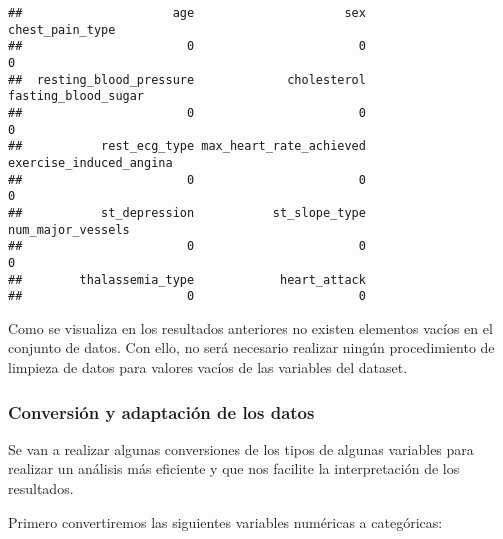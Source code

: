 \documentclass[
]{article}
\begin{document}
\begin{verbatim}
##                     age                     sex         chest_pain_type 
##                       0                       0                       0 
##  resting_blood_pressure             cholesterol     fasting_blood_sugar 
##                       0                       0                       0 
##           rest_ecg_type max_heart_rate_achieved exercise_induced_angina 
##                       0                       0                       0 
##           st_depression           st_slope_type       num_major_vessels 
##                       0                       0                       0 
##        thalassemia_type            heart_attack 
##                       0                       0
\end{verbatim}

Como se visualiza en los resultados anteriores no existen elementos
vacíos en el conjunto de datos. Con ello, no será necesario realizar
ningún procedimiento de limpieza de datos para valores vacíos de las
variables del dataset.

\hypertarget{conversiuxf3n-y-adaptaciuxf3n-de-los-datos}{%
\subsubsection{Conversión y adaptación de los
datos}\label{conversiuxf3n-y-adaptaciuxf3n-de-los-datos}}

Se van a realizar algunas conversiones de los tipos de algunas variables
para realizar un análisis más eficiente y que nos facilite la
interpretación de los resultados.

Primero convertiremos las siguientes variables numéricas a categóricas:
\end{document}
